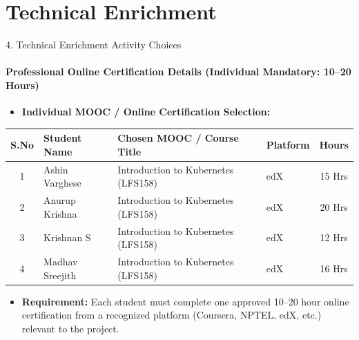 \documentclass[aspectratio=169, 11pt]{beamer}
\begin{document}
\section{Technical Enrichment}
\begin{frame}{4. Technical Enrichment Activity Choices}
    \framesubtitle{Professional Online Certification Details (Individual Mandatory: 10--20 Hours)}
    \begin{itemize}
        \item \textbf{Individual MOOC / Online Certification Selection:}
    \end{itemize}
    \vspace{-0.1cm}
    \begin{table}
        \centering
        \footnotesize
        \renewcommand{\arraystretch}{1.15}
        \begin{tabular}{|c|p{2.8cm}|p{5.5cm}|p{1.8cm}|c|}
            \hline
            \textbf{S.No} & \textbf{Student Name} & \textbf{Chosen MOOC / Course Title} & \textbf{Platform} & \textbf{Hours} \\
            \hline
            1 & Ashin Varghese & Introduction to Kubernetes (LFS158) & edX & 15 Hrs \\
            \hline
            2 & Anurup Krishna & Introduction to Kubernetes (LFS158) & edX & 20 Hrs \\
            \hline
            3 & Krishnan S & Introduction to Kubernetes (LFS158) & edX & 12 Hrs \\
            \hline
            4 & Madhav Sreejith & Introduction to Kubernetes (LFS158) & edX & 16 Hrs \\
            \hline
        \end{tabular}
    \end{table}
    \vspace{0.15cm}
    \begin{itemize}
        \item {\scriptsize \textbf{Requirement:} Each student must complete one approved 10--20 hour online certification from a recognized platform (Coursera, NPTEL, edX, etc.) relevant to the project.}
    \end{itemize}
\end{frame}

\end{document}
